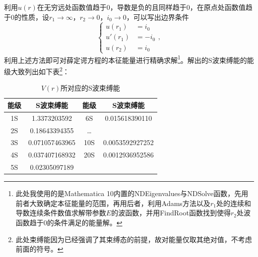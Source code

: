 \documentclass[cs4size,titlepage,twoside]{ctexart}
\begin{document}
利用$u(r)$在无穷远处函数值趋于0，导数是负的且同样趋于0，在原点处函数值趋于0的性质，设$r_1\rightarrow\infty$，$r_2\rightarrow0$，$i_0\rightarrow0$，可以写出边界条件
\begin{equation*}
	\begin{cases}
		u(r_1)  & =i_0  \\
		u'(r_1) & =-i_0 \\
		u(r_2)  & =i_0
	\end{cases}
	,
\end{equation*}
利用上述方法即可对薛定谔方程的本征能量进行精确求解\footnote{此处我使用的是Mathematica 10内置的NDEigenvalues与NDSolve函数，先用前者大致确定本征能量的范围，再用后者，利用Adams方法以及$r_1$处的连续和导数连续条件数值求解带参数$E$的波函数，并用FindRoot函数找到使得$r_2$处波函数趋于0的条件满足的能量解\cite{MMA,mma3}。}。解出的S波束缚能的能级大致列出如下表\footnote{此处束缚能因为已经强调了其束缚态的前提，故对能量仅取其绝对值，不考虑前面的符号。}：
\begin{table}[!htbp]
	\centering
	\begin{tabular}{|cccc|}
		\hline
		能级 & S波束缚能  & 能级 & S波束缚能   \\
		\hline
		1S     & 1.3373203592   & 6S     & 0.015618390110  \\
		2S     & 0.18643394355  & \dots  &                 \\
		3S     & 0.071057463965 & 10S    & 0.0053592927252 \\
		4S     & 0.037407168932 & 20S    & 0.0012936952586 \\
		5S     & 0.02305097189  &        &                 \\
		\hline
	\end{tabular}
	\caption{$V(r)$所对应的S波束缚能}
\end{table}
\end{document}
